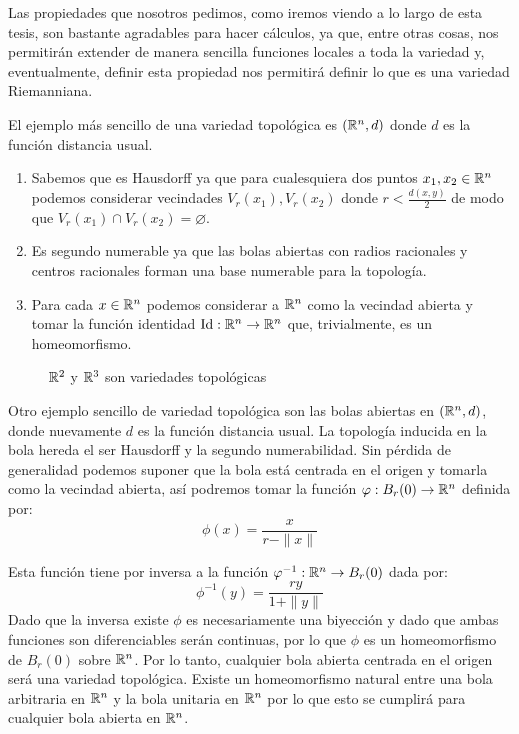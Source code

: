 Las propiedades que nosotros pedimos, como iremos viendo a lo largo de esta tesis, son bastante agradables para hacer cálculos, ya que, entre otras cosas, nos permitirán extender de manera sencilla funciones locales a toda la variedad y, eventualmente, definir esta propiedad nos permitirá definir lo que es una variedad Riemanniana.


\begin{example}\label{Ex: Variedad Topologica - Espacios Euclidianos}
	El ejemplo más sencillo de una variedad topológica es $(\mathbb{R}^n,d)$ donde $d$ es la función distancia usual.
	\begin{enumerate}
		\item Sabemos que es Hausdorff ya que para cualesquiera dos puntos $x_1,x_2 \in \mathbb{R}^n$ podemos considerar vecindades $V_r(x_1), V_r(x_2)$ donde $r < \frac{d(x,y)}{2}$ de modo que $V_r(x_1) \cap V_r(x_2) = \varnothing$.
		\item Es segundo numerable ya que las bolas abiertas con radios racionales y centros racionales forman una base numerable para la topología.
		\item Para cada $x \in \mathbb{R}^n$ podemos considerar a $\mathbb{R}^n$ como la vecindad abierta y tomar la función identidad $\mathrm{Id}: \mathbb{R}^n \to \mathbb{R}^n$ que, trivialmente, es un homeomorfismo.
	\end{enumerate}
\end{example}

\begin{figure}[h]
	\centering
	
	\caption{$\mathbb{R}^2$ y $\mathbb{R}^3$ son variedades topológicas}
\end{figure}

\begin{example}\label{Ex: Variedad Topologica - Bolas Abiertas}
	Otro ejemplo sencillo de variedad topológica son las bolas abiertas en $(\mathbb{R}^n,d)$, donde nuevamente $d$ es la función distancia usual. La topología inducida en la bola hereda el ser Hausdorff y la segundo numerabilidad. Sin pérdida de generalidad podemos suponer que la bola está centrada en el origen y tomarla como la vecindad abierta, así podremos tomar la función $\varphi: B_r(0) \to \mathbb{R}^n$ definida por:
	\[
		\phi(x) = \frac{x}{r - \|x\|}
	\]

	Esta función tiene por inversa a la función $\varphi^{-1}: \mathbb{R}^n \to B_r(0)$ dada por:
	\[ \phi^{-1}(y) = \frac{ry}{1 + \|y\|}
	\]
	Dado que la inversa existe $\phi$ es necesariamente una biyección y dado que ambas funciones son diferenciables serán continuas, por lo que $\phi$ es un homeomorfismo de $B_r(0)$ sobre $\mathbb{R}^n$. Por lo tanto, cualquier bola abierta centrada en el origen será una variedad topológica. Existe un homeomorfismo natural entre una bola arbitraria en $\mathbb{R}^n$ y la bola unitaria en $\mathbb{R}^n$ por lo que esto se cumplirá para cualquier bola abierta en $\mathbb{R}^n$.
\end{example}

